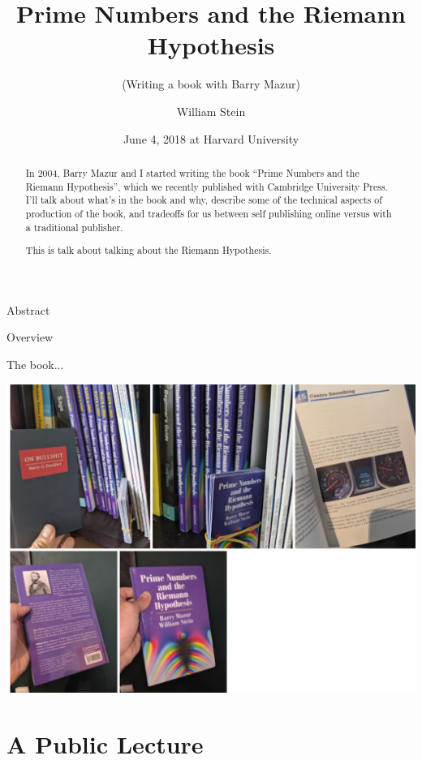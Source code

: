 \documentclass{beamer}
\title[Prime Numbers]{Prime Numbers and the Riemann Hypothesis}
\subtitle{(Writing a book with Barry Mazur)}
\author[W.\thinspace{}Stein]{William Stein}
\date[Mazur 80]{June 4, 2018 at Harvard University}
\institute[SageMath, Inc. \& UW]{SageMath, Inc. and University of Washington}
\begin{document}
\begin{frame}
  \titlepage
\end{frame}

\begin{frame}{Abstract}
  \begin{abstract}
    In 2004, Barry Mazur and I started writing the
    book ``Prime Numbers and the Riemann Hypothesis'', which we recently
    published with Cambridge University Press. I'll talk about
    what's in the book and why, describe some of the technical aspects
    of production of the book, and tradeoffs for us between
    self publishing online versus with a traditional publisher.

    \vspace{.3in}
    This is talk about talking about the Riemann Hypothesis.
  \end{abstract}
\end{frame}

\begin{frame}{Overview}
  \tableofcontents
\end{frame}

\begin{frame}{The book...}
  \begin{center}
    \includegraphics[height=.82\textheight]{pics/the-book.png}
  \end{center}
\end{frame}

\section{A Public Lecture}
\end{document}
